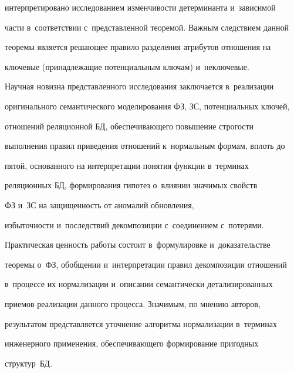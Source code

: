 интерпретировано исследованием из\-мен\-чи\-вости детерминанта и~зависимой 

час\-ти в~соответствии с~представленной тео\-ре\-мой. Важ\-ным следствием данной 

тео\-ре\-мы является решающее правило разделения атрибутов отношения на 

ключевые (принадлежащие потенциальным ключам) и~неключевые.

  

  Научная новизна представленного исследования заключается в~реализации 

оригинального семантического моделирования ФЗ, ЗС, потенциальных ключей, 

отношений реляционной БД, обес\-пе\-чи\-ва\-юще\-го повышение стро\-гости 

выполнения правил приведения отношений к~нормальным формам, вплоть до 

пятой, основанного на интерпретации понятия функции в~терминах 

реляционных БД, формирования гипотез о~влиянии значимых свойств 

ФЗ и~ЗС на за\-щи\-щен\-ность от аномалий обновления, 

из\-бы\-точ\-ности и~по\-след\-ст\-вий декомпозиции с~со\-еди\-не\-ни\-ем с~потерями.

  

  Практическая ценность работы состоит в~формулировке и~доказательстве 

тео\-ре\-мы о~ФЗ, обобщении и~интерпретации правил декомпозиции отношений 

в~процессе их нормализации и~описании семантически детализированных 

приемов реализации данного процесса. Значимым, по мнению авторов, 

результатом пред\-став\-ля\-ет\-ся уточнение алгоритма нормализации в~терминах 

инженерного применения, обес\-пе\-чи\-ва\-юще\-го формирование пригодных 

структур~БД.

  

